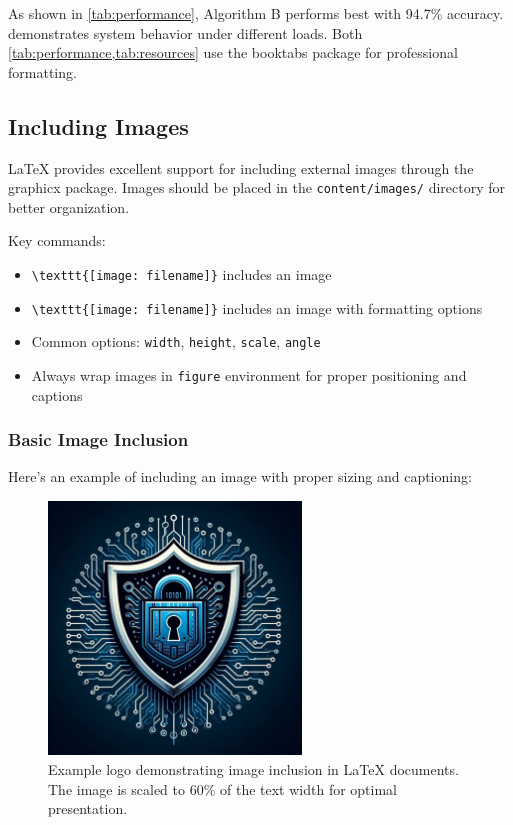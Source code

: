 As shown in \cref{tab:performance}, Algorithm B performs best with 94.7\% accuracy.  demonstrates system behavior under different loads. Both \cref{tab:performance,tab:resources} use the booktabs package for professional formatting.

\subsection{Including Images}

LaTeX provides excellent support for including external images through the graphicx package. Images should be placed in the \verb+content/images/+ directory for better organization.

Key commands:
\begin{itemize}
    \item \verb+\texttt{[image: filename]}+ includes an image
    \item \verb+\texttt{[image: filename]}+ includes an image with formatting options
    \item Common options: \verb+width+, \verb+height+, \verb+scale+, \verb+angle+
    \item Always wrap images in \verb+figure+ environment for proper positioning and captions
\end{itemize}

\subsubsection{Basic Image Inclusion}

Here's an example of including an image with proper sizing and captioning:

\begin{figure}[htbp]
    \centering
    \includegraphics[width=0.6\textwidth]{content/images/logo.jpg}
    \caption{Example logo demonstrating image inclusion in LaTeX documents. The image is scaled to 60\% of the text width for optimal presentation.}
    \label{fig:example_logo}
\end{figure}


